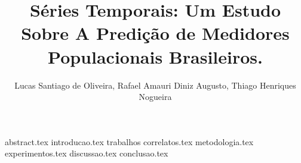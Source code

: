 \documentclass{article}
\title{Séries Temporais: Um Estudo Sobre A Predição de Medidores Populacionais Brasileiros.}
\author{Lucas Santiago de Oliveira\inst{1}, Rafael Amauri Diniz Augusto\inst{1}, Thiago Henriques Nogueira\inst{1}}
\begin{document}
  \maketitle

  {abstract.tex}
  {introducao.tex}
  {trabalhos correlatos.tex}
  {metodologia.tex}
  {experimentos.tex}
  {discussao.tex}
  {conclusao.tex}

  
  
\end{document}
